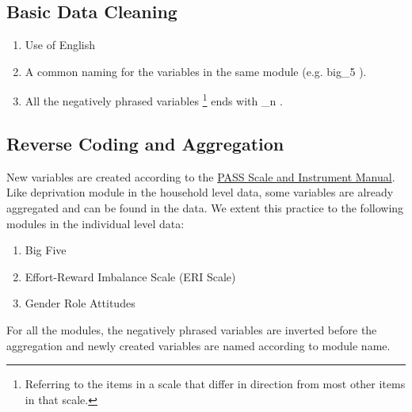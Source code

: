 \documentclass[11pt, a4paper, leqno]{article}
\begin{document}
\subsection{Basic Data Cleaning}
\begin{enumerate}
\item Use of English
\item A common naming for the variables in the same module (e.g.  big\_5 ).
\item All the negatively phrased variables \footnote{Referring to the items in a scale that differ in direction from most other items in that scale.} ends with  \_n .
\end{enumerate}
\subsection{Reverse Coding and Aggregation}
New variables are created according to the \href{https://doku.iab.de/fdz/reporte/2020/MR_07-20_EN.pdf}{PASS Scale and Instrument Manual}.\\[12pt]
Like deprivation module in the household level data, some variables are already aggregated and can be found in the data. We extent this practice to the following modules in the individual level data:
\begin{enumerate}
\item Big Five
\item Effort-Reward Imbalance Scale (ERI Scale)
\item Gender Role Attitudes
\end{enumerate}
For all the modules, the negatively phrased variables are inverted before the aggregation and newly created variables are named according to module name.
\end{document}
